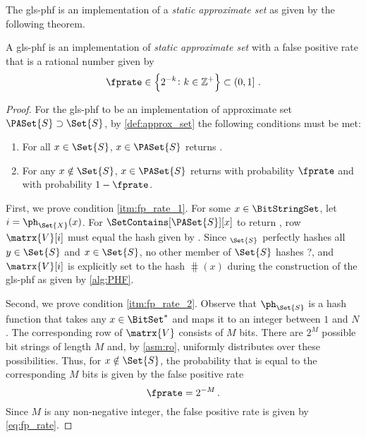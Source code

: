 \documentclass[ ../main.tex]{subfiles}
\begin{document}
The \gls{gls-phf} is an implementation of a \emph{static approximate set} as given by the following theorem.
\begin{theorem}
\label{thm:fp_rate}
A \gls{gls-phf} is an implementation of \emph{static approximate set} with a false positive rate that is a rational number given by
\begin{equation}
\label{eq:fp_rate}
    \fprate \in \left\{ 2^{-k} \colon k \in \mathbb{Z}^+\right\} \subset \left(0, 1\right]\,.
\end{equation}
\end{theorem}
\begin{proof}
For the \gls{gls-phf} to be an implementation of approximate set $\PASet{S} \supset \Set{S}$, by \cref{def:approx_set} the following conditions must be met:
\begin{enumerate}
\item\label{itm:fp_rate_1} For all $x \in \Set{S}$, $x \in \PASet{S}$ returns \True.
\item\label{itm:fp_rate_2} For any $x \notin \Set{S}$, $x \in \PASet{S}$ returns \True with probability $\fprate$ and \False with probability $1 - \fprate$.
\end{enumerate}

First, we prove condition \ref{itm:fp_rate_1}. For some $x \in \BitStringSet$,
let $i = \ph_{\Set{X}}(x)$. For $\SetContains[\PASet{S}][x]$ to return \True, row $\matrx{V}[i]$ must equal the hash given by . Since \ph$_{\Set{S}}$ perfectly hashes all $y \in \Set{S}$ and $x \in \Set{S}$, no other member of $\Set{S}$ hashes ?, and $\matrx{V}[i]$ is explicitly set to the hash $\hash(x)$ during the construction of the \gls{gls-phf} as given by \cref{alg:PHF}.

Second, we prove condition \ref{itm:fp_rate_2}. Observe that $\ph_{\Set{S}}$ is a hash function that takes any $x \in \BitSet^*$ and maps it to an integer between $1$ and $N$. The corresponding row of $\matrx{V}$ consists of $M$ bits. There are $2^M$ possible bit strings of length $M$ and, by \cref{asm:ro}, \hash uniformly distributes over these possibilities. Thus, for $x \notin \Set{S}$, the probability that  is equal to the corresponding $M$ bits is given by the false positive rate
\begin{equation}
\fprate = 2^{-M}\,.
\end{equation}
Since $M$ is any non-negative integer, the false positive rate is given by \cref{eq:fp_rate}.
\end{proof}
\end{document}

